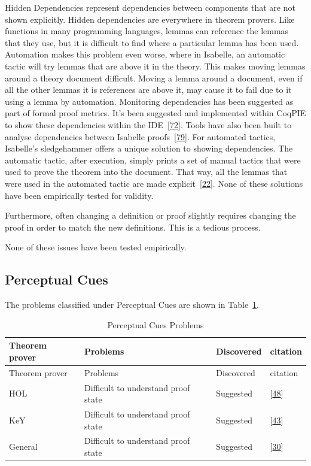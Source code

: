 \documentclass[
]{article}
\begin{document}
Hidden Dependencies represent dependencies between components that are
not shown explicitly. Hidden dependencies are everywhere in theorem
provers. Like functions in many programming languages, lemmas can
reference the lemmas that they use, but it is difficult to find where a
particular lemma has been used. Automation makes this problem even
worse, where in Isabelle, an automatic tactic will try lemmas that are
above it in the theory. This makes moving lemmas around a theory
document difficult. Moving a lemma around a document, even if all the
other lemmas it is references are above it, may cause it to fail due to
it using a lemma by automation. Monitoring dependencies has been
suggested as part of formal proof metrics. It's been suggested and
implemented within CoqPIE to show these dependencies within the
IDE~{[}\protect\hyperlink{ref-roe_coqpie_2016}{72}{]}. Tools have also
been built to analyse dependencies between Isabelle
proofs~{[}\protect\hyperlink{ref-spichkova_human-centred_2017}{79}{]}.
For automated tactics, Isabelle's sledgehammer offers a unique solution
to showing dependencies. The automatic tactic, after execution, simply
prints a set of manual tactics that were used to prove the theorem into
the document. That way, all the lemmas that were used in the automated
tactic are made
explicit~{[}\protect\hyperlink{ref-bourke_challenges_2012}{22}{]}. None
of these solutions have been empirically tested for validity.

Furthermore, often changing a definition or proof slightly requires
changing the proof in order to match the new definitions. This is a
tedious process.

None of these issues have been tested empirically.

\hypertarget{perceptual-cues}{%
\subsection{Perceptual Cues}\label{perceptual-cues}}

The problems classified under Perceptual Cues are shown in
Table~\ref{tbl:perceptual_cues}.

\hypertarget{tbl:perceptual_cues}{}
\begin{longtable}[]{@{}llll@{}}
\caption{\label{tbl:perceptual_cues}Perceptual Cues
Problems}\tabularnewline
\toprule
Theorem prover & Problems & Discovered & citation \\
\midrule
\endfirsthead
\toprule
Theorem prover & Problems & Discovered & citation \\
\midrule
\endhead
HOL & Difficult to understand proof state & Suggested &
{[}\protect\hyperlink{ref-kadoda_cognitive_2000}{48}{]} \\
KeY & Difficult to understand proof state & Suggested &
{[}\protect\hyperlink{ref-hentschel_integrating_2016}{43}{]} \\
General & Difficult to understand proof state & Suggested &
{[}\protect\hyperlink{ref-eastaughffe_support_1998}{30}{]} \\
\bottomrule
\end{longtable}
\end{document}
